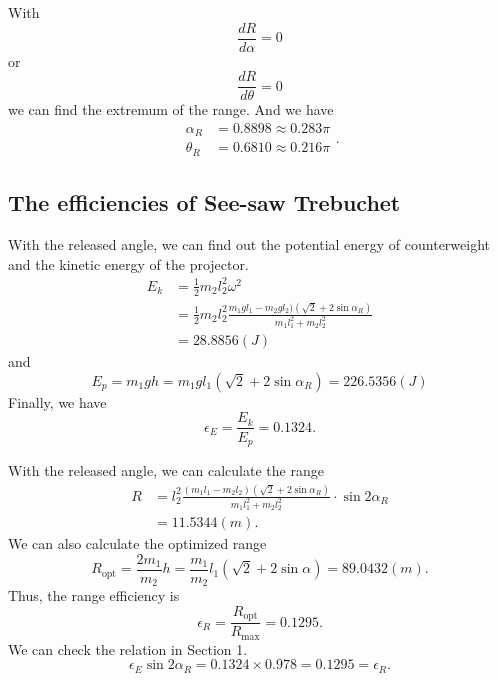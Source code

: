 \documentclass[%
reprint,
amsmath,amssymb,
aps,
]{revtex4-1}
\begin{document}
	With
	\begin{equation}
	\frac{dR}{d\alpha}=0
	\end{equation}
	or
	\begin{equation}
	\frac{dR}{d\theta}=0
	\end{equation}
	we can find the extremum of the range. And we have 
	\begin{equation}
	\begin{aligned}
	\alpha_R&=0.8898\approx 0.283\pi
	\\
	\theta_R&=0.6810\approx 0.216\pi
	\end{aligned}.
	\end{equation}
	\subsection{The efficiencies of See-saw Trebuchet}
	With the released angle, we can find out the potential energy of counterweight and the kinetic energy of the projector.
	\begin{equation}
	\begin{aligned}
	E_k&=\frac{1}{2}m_2l_2^2\omega^2
	\\&=\frac{1}{2}m_2l_2^2\frac{m_1gl_1-m_2gl_2)(\sqrt{2}+2\sin{\alpha_R})}{m_1l_1^2+m_2l_2^2}
	\\&=28.8856(J)
	\end{aligned}
	\end{equation}
	and
	\begin{equation}
	E_p=m_1gh=m_1gl_1(\sqrt{2}+2\sin\alpha_R)=226.5356(J)
	\end{equation}
	Finally, we have
	\begin{equation}
	\epsilon_E=\frac{E_k}{E_p}=0.1324.
	\end{equation}
	
	With the released angle, we can calculate the range
	\begin{equation}
	\begin{aligned}
	R&=l_2^2\frac{(m_1l_1-m_2l_2)(\sqrt{2}+2\sin{\alpha_R})}{m_1l_1^2+m_2l_2^2}\cdot\sin{2\alpha_R}\\&=11.5344(m).
	\end{aligned}
	\end{equation}
	We can also calculate the optimized range
	\begin{equation}
	R_{\mathrm{opt}}=\frac{2m_1}{m_2}h=\frac{m_1}{m_2}l_1(\sqrt{2}+2\sin\alpha)=89.0432(m).
	\end{equation}
	Thus, the range efficiency is 
	\begin{equation}
	\epsilon_R=\frac{R_{\mathrm{opt}}}{R_{\mathrm{max}}}=0.1295.
	\end{equation}
	We can check the relation in Section 1.
	\begin{equation}
	\epsilon_E\sin{2\alpha_R}=0.1324\times0.978=0.1295=\epsilon_R.
	\end{equation}
	\newline\newline
	\newpage
\end{document}
